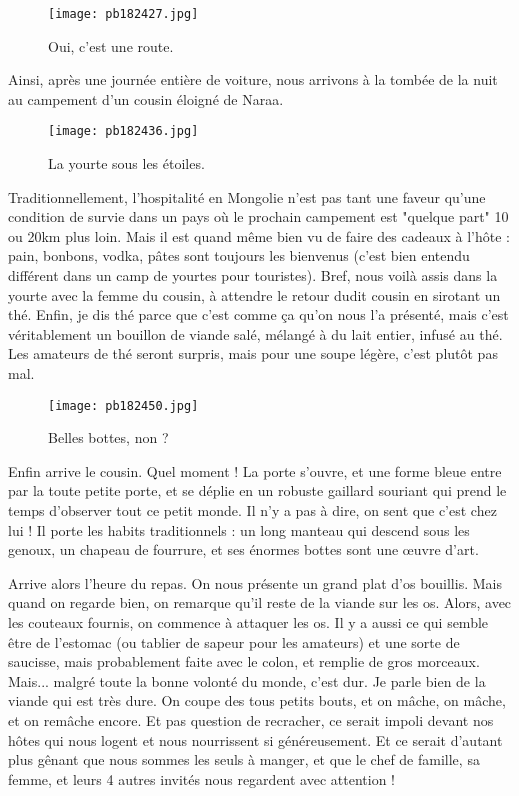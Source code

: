 \documentclass{book}
\begin{document}
\begin{figure}[h]
\centering
\texttt{[image: pb182427.jpg]}
\caption*{ Oui, c'est une route.}
\end{figure}

Ainsi, après une journée entière de voiture, nous arrivons à la tombée de la nuit au campement d'un cousin éloigné de Naraa.


\begin{figure}[h]
\centering
\texttt{[image: pb182436.jpg]}
\caption*{ La yourte sous les étoiles.}
\end{figure}

Traditionnellement, l'hospitalité en Mongolie n'est pas tant une faveur qu'une condition de survie dans un pays où le prochain campement est "quelque part" 10 ou 20km plus loin. Mais il est quand même bien vu de faire des cadeaux à l'hôte : pain, bonbons, vodka, pâtes sont toujours les bienvenus (c'est bien entendu différent dans un camp de yourtes pour touristes). Bref, nous voilà assis dans la yourte avec la femme du cousin, à attendre le retour dudit cousin en sirotant un thé. Enfin, je dis thé parce que c'est comme ça qu'on nous l'a présenté, mais c'est véritablement un bouillon de viande salé, mélangé à du lait entier, infusé au thé. Les amateurs de thé seront surpris, mais pour une soupe légère, c'est plutôt pas mal.


\begin{wrapfigure}{l}{0.5\textwidth}
\centering
\texttt{[image: pb182450.jpg]}
\caption*{ Belles bottes, non ?}
\end{wrapfigure}


Enfin arrive le cousin. Quel moment ! La porte s'ouvre, et une forme bleue entre par la toute petite porte, et se déplie en un robuste gaillard souriant qui prend le temps d'observer tout ce petit monde. Il n'y a pas à dire, on sent que c'est chez lui ! Il porte les habits traditionnels : un long manteau qui descend sous les genoux, un chapeau de fourrure, et ses énormes bottes sont une œuvre d'art.

Arrive alors l'heure du repas. On nous présente un grand plat d'os bouillis. Mais quand on regarde bien, on remarque qu'il reste de la viande sur les os. Alors, avec les couteaux fournis, on commence à attaquer les os. Il y a aussi ce qui semble être de l'estomac (ou tablier de sapeur pour les amateurs) et une sorte de saucisse, mais probablement faite avec le colon, et remplie de gros morceaux. Mais... malgré toute la bonne volonté du monde, c'est dur. Je parle bien de la viande qui est très dure. On coupe des tous petits bouts, et on mâche, on mâche, et on remâche encore. Et pas question de recracher, ce serait impoli devant nos hôtes qui nous logent et nous nourrissent si généreusement. Et ce serait d'autant plus gênant que nous sommes les seuls à manger, et que le chef de famille, sa femme, et leurs 4 autres invités nous regardent avec attention !
\end{document}
